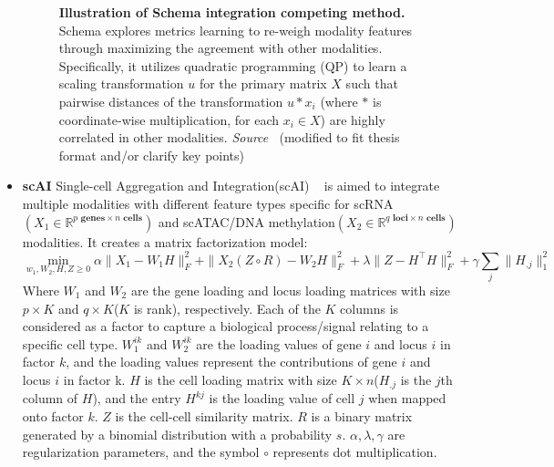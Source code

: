 \begin{itemize}
\begin{figure}[!ht]
    	\vspace{0.1cm}
    	\caption[Illustration of Schema integration competing method.]{\textbf{Illustration of Schema integration competing method.} Schema explores metrics learning to re-weigh modality features through maximizing the agreement with other modalities. Specifically, it utilizes quadratic programming (QP) to learn a scaling transformation $u$ for the primary matrix $X$ such that pairwise distances of the transformation $u * x_i$ (where $*$ is coordinate-wise multiplication, for each $x_i\in X$) are highly correlated in other modalities. \emph{Source ~\cite{singh2021schema}}(modified to fit thesis format and/or clarify key points)
    }
    	\label{fig:Alg_Schema}
    \end{figure}    
    \item \textbf{scAI}
    Single-cell Aggregation and Integration(scAI) ~\citep{jin2020scai} is aimed to integrate multiple modalities with different feature types specific for scRNA $(X_1\in \mathbb{R}^{p \textbf{ genes} \times n \textbf{ cells}})$ and scATAC/DNA methylation$(X_2\in \mathbb{R}^{q \textbf{ loci}\times n \textbf{ cells}})$ modalities. It creates a matrix factorization model:
    \begin{equation}
    \min_{w_1,W_2,H,Z\geq 0} \alpha \|X_1-W_1H\|_F^2 + \|X_2(Z \circ R)-W_2H\|_F^2 + \lambda \|Z-H^\top H\|_F^2 + \gamma\sum_j \|H_{.j}\|_1^2
    \end{equation}
    Where $W_1$ and $W_2$ are the gene loading and locus loading matrices with size $p\times K$ and $q\times K$($K$ is rank), respectively. Each of the $K$ columns is considered as a factor to capture a biological process/signal relating to a specific cell type. $W_1^{ik}$ and $W_2^{ik}$ are the loading values of gene $i$ and locus $i$ in factor $k$, and the loading values represent the contributions of gene $i$ and locus $i$ in factor k. $H$ is the cell loading matrix with size $K\times n$($H_{.j}$ is the $j$th column of $H$), and the entry $H^{kj}$ is the loading value of cell $j$ when mapped onto factor $k$. $Z$ is the cell-cell similarity matrix. $R$ is a binary matrix generated by a binomial distribution with a probability $s$. $\alpha, \lambda, \gamma$ are regularization parameters, and the symbol $\circ$ represents dot multiplication.
    

\end{itemize}
